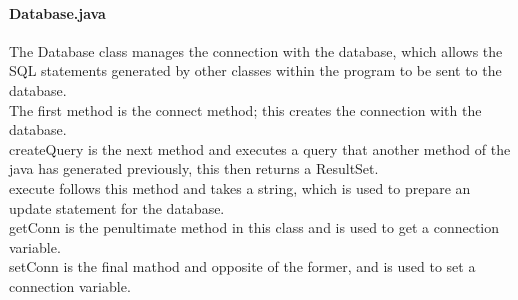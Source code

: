 \documentclass{project}
\begin{document}
\paragraph{Database.java}
The Database class manages the connection with the database, which allows the SQL statements generated by other classes within the program to be sent to the database. \\
The first method is the connect method; this creates the connection with the database.\\
createQuery is the next method and executes a query that another method of the java has generated previously, this then returns a ResultSet.\\
execute follows this method and takes a string, which is used to prepare an update statement for the database.\\
getConn is the penultimate method in this class and is used to get a connection variable.\\
setConn is the final mathod and opposite of the former, and is used to set a connection variable.
\end{document}
